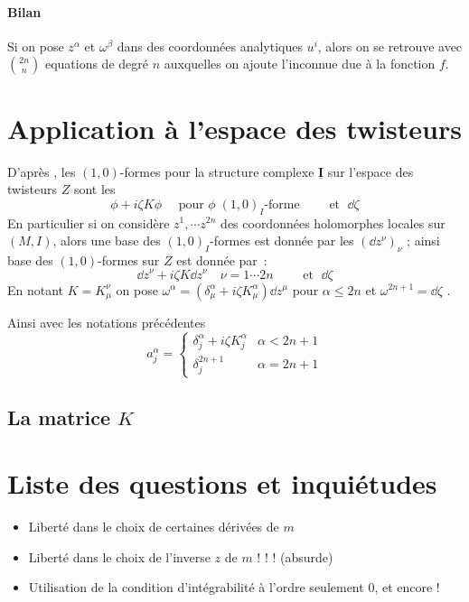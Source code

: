 \documentclass[a4paper,draft]{amsart}
\begin{document}
\paragraph{Bilan} Si on pose $z^\alpha$ et $\omega^\beta$ dans des coordonnées analytiques $u^i$, alors on se retrouve avec $\binom{2n}{n}$ equations de degré $n$ auxquelles on ajoute l'inconnue due à la fonction $f$.

\section{Application à l'espace des twisteurs}
D'après \cite{Hitchin-Karlhede}, les $(1,0)$-formes pour la structure complexe $\underline{\textbf{I}}$ sur l'espace des twisteurs $Z$ sont les
\[
\phi + i \zeta K \phi \quad \text{ pour } \phi \; (1,0)_I\text{-forme} \qquad \text{ et } \; \dd \zeta
\]
En particulier si on considère $z^1,\cdots z^{2n}$ des coordonnées holomorphes locales sur $(M,I)$, alors une base des $(1,0)_I$-formes est donnée par les $(\dd z^\nu)_\nu$ ; ainsi base des $(1,0)$-formes sur $Z$ est donnée par~:
\[
\dd z^\nu + i \zeta K \dd z^\nu \quad \nu=1 \cdots  2n \qquad \text{ et } \; \dd \zeta
\]
En notant $K = K^\nu_\mu$ on pose $\omega^\alpha = (\delta^\alpha_\mu + i \zeta K^\alpha_\mu)\dd z^\mu$ pour $\alpha \leq 2n$ et $\omega^{2n+1} = \dd \zeta$ .

Ainsi avec les notations précédentes
\[
a_j^\alpha = \left\lbrace
\begin{array}{cc}
\delta^\alpha_j + i \zeta K^\alpha_j & \alpha < 2n+1 \\ 
\delta^{2n+1}_j & \alpha = 2n+1
\end{array} 
\right.
\]
\subsection{La matrice $K$} 


\section{Liste des questions et inquiétudes}
\begin{itemize}
\item Liberté dans le choix de certaines dérivées de $m$
\item Liberté dans le choix de l'inverse $z$ de $m$ ! ! ! (absurde)
\item Utilisation de la condition d'intégrabilité à l'ordre seulement $0$, et encore !
\end{itemize}
\end{document}
